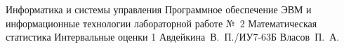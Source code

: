 \makereporttitle
{Информатика и системы управления} %
{Программное обеспечение ЭВМ и информационные технологии} %
{лабораторной работе №~2} %
{Математическая статистика} %
{Интервальные оценки} %
{1} %
{Авдейкина~В.~П./ИУ7-63Б} %
{Власов~П.~А.} %